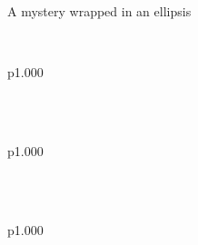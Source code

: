 \label{Ocamlary-type-any_obj}\\
\label{Ocamlary-type-empty_obj}\\
\label{Ocamlary-type-one_meth}\\
\label{Ocamlary-type-ext}\begin{ocamlindent}A mystery wrapped in an ellipsis\end{ocamlindent}%
\medbreak
\label{Ocamlary-extension-decl-ExtA}\\
\begin{ocamltabular}{p{1.000\textwidth}}\label{Ocamlary-extension-ExtA}\\
\end{ocamltabular}%
\\
\label{Ocamlary-extension-decl-ExtB}\\
\begin{ocamltabular}{p{1.000\textwidth}}\label{Ocamlary-extension-ExtB}\\
\end{ocamltabular}%
\\
\label{Ocamlary-extension-decl-ExtC}\\
\begin{ocamltabular}{p{1.000\textwidth}}\label{Ocamlary-extension-ExtC}\\
\label{Ocamlary-extension-ExtD}\\
\end{ocamltabular}%
\\
\label{Ocamlary-extension-decl-ExtE}\\
